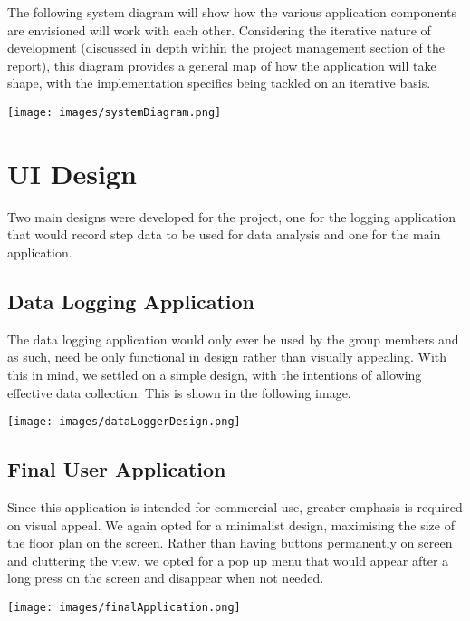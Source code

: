 \documentclass[main.tex]{subfiles}
\begin{document}
The following system diagram will show how the various application components are envisioned will work with each other. Considering the iterative nature of development (discussed in depth within the project management section of the report), this diagram provides a general map of how the application will take shape, with the implementation specifics being tackled on an iterative basis.

\begin{center}
\texttt{[image: images/systemDiagram.png]}
\label{fig:systemDiagram}
\end{center}


\section{UI Design}

Two main designs were developed for the project, one for the logging application that would record step data to be used for data analysis and one for the main application.

\subsection{Data Logging Application}

The data logging application would only ever be used by the group members and as such, need be only functional in design rather than visually appealing. With this in mind, we settled on a simple design, with the intentions of allowing effective data collection. This is shown in the following image.

\begin{center}
\texttt{[image: images/dataLoggerDesign.png]}
\label{fig:dataLogger}
\end{center}

\subsection{Final User Application}

Since this application is intended for commercial use, greater emphasis is required on visual appeal. We again opted for a minimalist design, maximising the size of the floor plan on the screen. Rather than having buttons permanently on screen and cluttering the view, we opted for a pop up menu that would appear after a long press on the screen and disappear when not needed.

\begin{center}
\texttt{[image: images/finalApplication.png]}
\label{fig:finalApplication}
\end{center}
\end{document}
